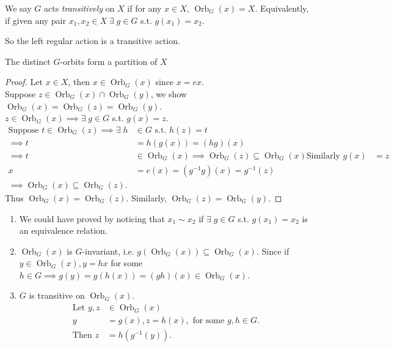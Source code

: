 \begin{definition} \label{def:18}
    We say $G$ acts \emph{transitively} on $X$ if for any $x \in X$, $\operatorname{Orb}_G(x) = X$.
    Equivalently, if given any pair $x_1, x_2 \in X \; \exists \; g \in G$ s.t. $g(x_1) = x_2$.

    So the left regular action is a transitive action.
\end{definition} 

\begin{lemma} \label{lem:17}
    The distinct $G$-orbits form a partition of $X$
\end{lemma} 

\begin{proof}
    Let $x \in X$, then $x \in \operatorname{Orb}_G(x)$ since $x = ex$. \\
    Suppose $z \in \operatorname{Orb}_G(x) \cap \operatorname{Orb}_G(y)$, we show $\operatorname{Orb}_G(x) = \operatorname{Orb}_G(z) = \operatorname{Orb}_G(y)$. \\
    $z \in \operatorname{Orb}_G(x) \implies \exists \; g \in G$ s.t. $g(x) = z$.
    \begin{align*}
        \text{Suppose } t \in \operatorname{Orb}_G(z) \implies \exists \; h &\in G \text{ s.t. } h(z) = t \\
        \implies t &= h(g(x)) = (hg)(x) \\
        \implies t &\in \operatorname{Orb}_G(x)
        \implies \operatorname{Orb}_G(z) \subseteq \operatorname{Orb}_G(x)
        \text{Similarly } g(x) &= z \\
        x &= e(x) = (g^{-1} g)(x) = g^{-1}(z) \\
        \implies \operatorname{Orb}_G(x) \subseteq \operatorname{Orb}_G(z).
    \end{align*} 
    Thus $\operatorname{Orb}_G(x) = \operatorname{Orb}_G(z)$.
    Similarly, $\operatorname{Orb}_G(z) = \operatorname{Orb}_G(y)$.
\end{proof} 

\begin{remark} \mbox{}
    \begin{enumerate}
        \item We could have proved  by noticing that $x_1 \sim x_2$ if $\exists \; g \in G$ s.t. $g(x_1) = x_2$ is an equivalence relation.
        \item $\operatorname{Orb}_G(x)$ is $G$-invariant, i.e. $g \left( \operatorname{Orb}_G(x) \right) \subseteq \operatorname{Orb}_G(x)$.
        Since if $y \in \operatorname{Orb}_G(x), y = hx$ for some $h \in G \implies g(y) = g(h(x)) = (gh)(x) \in \operatorname{Orb}_G(x)$.
        \item $G$ is transitive on $\operatorname{Orb}_G(x)$.
        \begin{align*}
            \text{Let } y, z &\in \operatorname{Orb}_G(x) \\
            y &= g(x), z = h(x), \text{ for some } g, h \in G. \\
            \text{Then } z &= h(g^{-1}(y)).
        \end{align*} 
    \end{enumerate} 
\end{remark} 

